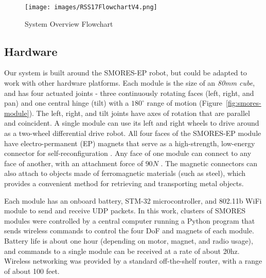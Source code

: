 \documentclass[conference]{IEEEtran}
\begin{document}
%
\begin{figure}
\begin{center}
\texttt{[image: images/RSS17FlowchartV4.png]}
\caption{System Overview Flowchart}
\label{fig:overview}
\end{center}
\vspace{-1em}
\end{figure}

%


\subsection{Hardware} %
\label{sec:hardware}
%
%
Our system is built around the SMORES-EP robot, but could be adapted to
work with other hardware platforms. Each module is the size of an \textit{80mm cube}, and has four actuated joints - three continuously rotating faces (left, right, and
pan)  and one central hinge (tilt) with a \(180^\circ\) range of motion
(Figure~\ref{fig:smores-module}). The left, right, and tilt joints have
 axes of rotation that are parallel and coincident. A single module can use its
left and right wheels to drive around as a two-wheel differential drive robot.
All four faces of the SMORES-EP module have electro-permanent (EP) magnets
that serve as a high-strength, low-energy connector for self-reconfiguration
\cite{tosun2016design}.  Any face of one module can connect to any face of
another, with an attachment force of $90N$ \cite{tosun2016design}. The magnetic connectors can also attach to objects made of ferromagnetic materials (such as steel), which provides a convenient method for retrieving and transporting metal objects.

Each module has an onboard battery, STM-32 microcontroller, and 802.11b WiFi
module to send and receive UDP packets.  In this work, clusters of SMORES
modules were controlled by a central computer running a Python program that
sends wireless commands to control the four DoF and magnets of each module.
Battery life is about one hour (depending on motor, magnet, and radio usage),
and commands to a single module can be received at a rate of about 20hz.
Wireless networking was provided by a standard off-the-shelf  router, with a
range of about 100 feet.
\end{document}
